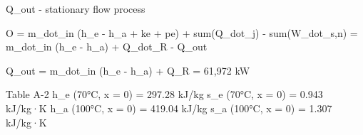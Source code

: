Q_out - stationary flow process  

O = m_dot_in (h_e - h_a + ke + pe) + sum(Q_dot_j) - sum(W_dot_s,n)  
= m_dot_in (h_e - h_a) + Q_dot_R - Q_out  

Q_out = m_dot_in (h_e - h_a) + Q_R  
= 61,972 kW  

Table A-2  
h_e (70°C, x = 0) = 297.28 kJ/kg  
s_e (70°C, x = 0) = 0.943 kJ/kg·K  
h_a (100°C, x = 0) = 419.04 kJ/kg  
s_a (100°C, x = 0) = 1.307 kJ/kg·K